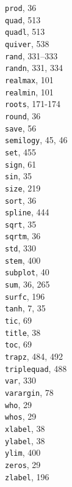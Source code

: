 \documentclass[../main.tex]{subfiles}
\begin{document}
\begin{multicols}{3}
    \texttt{prod}, 36\\
    \texttt{quad}, 513\\
    \texttt{quadl}, 513\\
    \texttt{quiver}, 538\\
    \texttt{rand}, 331–333\\
    \texttt{randn}, 331, 334\\
    \texttt{realmax}, 101\\
    \texttt{realmin}, 101\\
    \texttt{roots}, 171-174\\
    \texttt{round}, 36\\
    \texttt{save}, 56\\
    \texttt{semilogy}, 45, 46\\
    \texttt{set}, 455\\
    \texttt{sign}, 61\\
    \texttt{sin}, 35\\
    \texttt{size}, 219\\
    \texttt{sort}, 36\\
    \texttt{spline}, 444\\
    \texttt{sqrt}, 35\\
    \texttt{sqrtm}, 36\\
    \texttt{std}, 330\\
    \texttt{stem}, 400\\
    \texttt{subplot}, 40\\
    \texttt{sum}, 36, 265\\
    \texttt{surfc}, 196\\
    \texttt{tanh}, 7, 35\\
    \texttt{tic}, 69\\
    \texttt{title}, 38\\
    \texttt{toc}, 69\\
    \texttt{trapz}, 484, 492\\
    \texttt{triplequad}, 488\\
    \texttt{var}, 330\\
    \texttt{varargin}, 78\\
    \texttt{who}, 29\\
    \texttt{whos}, 29\\
    \texttt{xlabel}, 38\\
    \texttt{ylabel}, 38\\
    \texttt{ylim}, 400\\
    \texttt{zeros}, 29\\
    \texttt{zlabel}, 196\\

\end{multicols}
\end{document}

